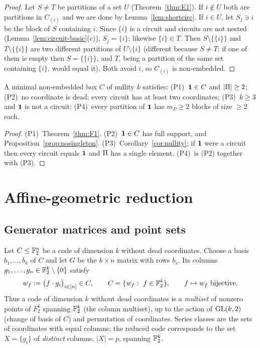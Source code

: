 \begin{proof}
Let $S\ne T$ be partitions of a set $U$ (Theorem~\ref{thm:E1}). If $i\notin U$ both are partitions in $C_{(i)}$ and we are done by Lemma~\ref{lem:shortcirc}. If $i\in U$, let $S_j\ni i$ be the block of $S$ containing $i$. Since $\{i\}$ is a circuit and circuits are not nested (Lemma~\ref{lem:circuit-basic}(c)), $S_j=\{i\}$; likewise $\{i\}\in T$. Then $S\setminus\{\{i\}\}$ and $T\setminus\{\{i\}\}$ are two different partitions of $U\setminus\{i\}$ (different because $S\ne T$; if one of them is empty then $S=\{\{i\}\}$, and $T$, being a partition of the same set containing $\{i\}$, would equal it). Both avoid $i$, so $C_{(i)}$ is non-embedded.
\end{proof}


\begin{corollary}\label{cor:minprops}
A minimal non-embedded box $C$ of nullity $k$ satisfies: (P1)~$\mathbf 1\in C$ and $|\Pi|\ge2$; (P2)~no coordinate is dead; every circuit has at least two coordinates; (P3)~$k\ge3$ and $\mathbf 1$ is not a circuit; (P4)~every partition of $\mathbf 1$ has $m_P\ge2$ blocks of size $\ge2$ each.
\end{corollary}

\begin{proof}
(P1)~Theorem~\ref{thm:F1}. (P2)~$\mathbf 1\in C$ has full support, and Proposition~\ref{prop:nosingleton}. (P3)~Corollary~\ref{cor:nullity}; if $\mathbf 1$ were a circuit then every circuit equals $\mathbf 1$ and $\Pi$ has a single element. (P4)~is (P2) together with (P3).
\end{proof}

\section{Affine-geometric reduction}\label{sec:affine}

\subsection{Generator matrices and point sets}

Let $C\le\mathbb F_2^n$ be a code of dimension $k$ without dead coordinates. Choose a basis $b_1,\dots,b_k$ of $C$ and let $G$ be the $k\times n$ matrix with rows $b_s$. Its columns $g_1,\dots,g_n\in\mathbb F_2^k\setminus\{0\}$ satisfy
\[
w_f:=\bigl(f\cdot g_i\bigr)_{i\in[n]}\in C,\qquad C=\{w_f:\ f\in\mathbb F_2^k\},\qquad f\mapsto w_f\ \text{bijective}.
\]
Thus a code of dimension $k$ without dead coordinates is a \emph{multiset} of nonzero points of $F_2^k$ spanning $\mathbb F_2^k$ (the column multiset), up to the action of $\mathrm{GL}(k,2)$ (change of basis of $C$) and permutation of coordinates. Series classes are the sets of coordinates with equal columns; the reduced code corresponds to the set $X=\{g_i\}$ of \emph{distinct} columns, $|X|=p$, spanning $\mathbb F_2^k$.

